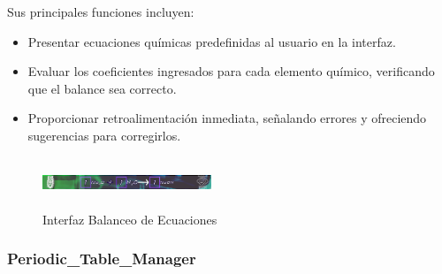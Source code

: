\documentclass[conference]{IEEEtran}
\begin{document}
Sus principales funciones incluyen:
\begin{itemize}
    \item Presentar ecuaciones químicas predefinidas al usuario en la interfaz.
    \item Evaluar los coeficientes ingresados para cada elemento químico, verificando que el balance sea correcto.
    \item Proporcionar retroalimentación inmediata, señalando errores y ofreciendo sugerencias para corregirlos.
\end{itemize}
\begin{figure}[thbp]
    \centering
    \includegraphics[width=0.45\textwidth, height = 1.5cm]{img/Fórmula (2).png}
    \caption{Interfaz Balanceo de Ecuaciones}
    \label{fig:Interfaz Balanceo de Ecuaciones}
\end{figure}

\subsubsection{Periodic\_Table\_Manager}
\end{document}
